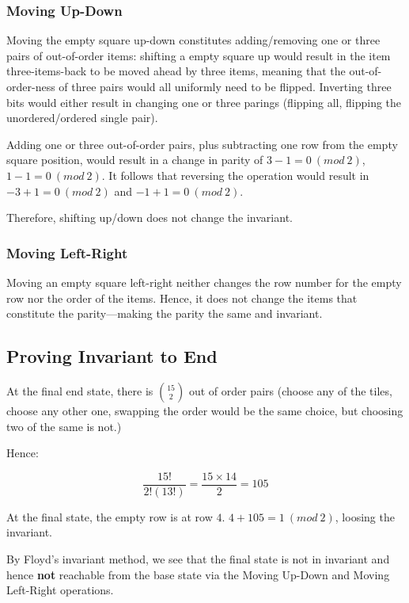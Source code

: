 \documentclass[letterpaper]{article}
\begin{document}
\subsubsection{Moving Up-Down}
\label{sec:orgc99a2cd}
Moving the empty square up-down constitutes adding/removing one or three pairs of out-of-order items: shifting a empty square up would result in the item three-items-back to be moved ahead by three items, meaning that the out-of-order-ness of three pairs would all uniformly need to be flipped. Inverting three bits would either result in changing one or three parings (flipping all, flipping the unordered/ordered single pair). 

Adding one or three out-of-order pairs, plus subtracting one row from the empty square position, would result in a change in parity of \(3-1 = 0\ (mod\ 2)\), \(1-1=0\ (mod\ 2)\). It follows that reversing the operation would result in \(-3+1=0\ (mod\ 2)\) and \(-1+1=0\ (mod\ 2)\).

Therefore, shifting up/down does not change the invariant.

\subsubsection{Moving Left-Right}
\label{sec:org5b4a872}
Moving an empty square left-right neither changes the row number for the empty row nor the order of the items. Hence, it does not change the items that constitute the parity---making the parity the same and invariant.

\subsection{Proving Invariant to End}
\label{sec:orga454189}
At the final end state, there is \({15 \choose 2}\) out of order pairs (choose any of the tiles, choose any other one, swapping the order would be the same choice, but choosing two of the same is not.)

Hence:

\begin{equation}
\frac{15!}{2!(13!)}  = \frac{15\times14}{2}  = 105
\end{equation}

At the final state, the empty row is at row \(4\). \(4+105 = 1\ (mod\ 2)\), loosing the invariant.

By Floyd's invariant method, we see that the final state is not in invariant and hence \textbf{not} reachable from the base state via the Moving Up-Down and Moving Left-Right operations.
\end{document}

